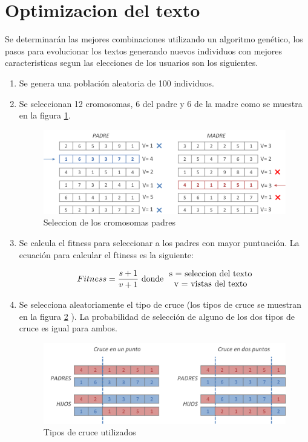 \clearpage
\section{Optimizacion del texto}

Se determinarán las mejores combinaciones utilizando un algoritmo genético, los pasos para evolucionar los textos generando nuevos individuos con mejores caracteristicas segun las elecciones de los usuarios son los siguientes.

\begin{enumerate}[\hspace*{0.5cm} P{a}so 1]
\item Se genera una población aleatoria de 100 individuos.
\item Se seleccionan 12 cromosomas, 6 del padre y 6 de la madre como se muestra en la figura \ref{padres}.

\begin{figure}[htp]
  \centerline{\includegraphics[width=6in]{padres.png}} 
  \caption{Seleccion de los cromosomas padres} 
\label{padres}
\end{figure}

\item Se calcula el fitness para seleccionar a los padres con mayor puntuación. La ecuación para calcular el ftiness es la siguiente:

\begin{equation}
Fitness = \frac{s+1 }{v+1 }   \textup{ donde }   \begin{matrix} \textup{ s = seleccion del texto} \\ \textup{ v = vistas del texto}\end{matrix}
\end{equation}

\item Se selecciona aleatoriamente  el tipo de cruce (los tipos de cruce se muestran en la figura \ref{cruce} ). La probabilidad de selección de alguno de los dos tipos de cruce es igual para ambos.

\begin{figure}[htp]
  \centerline{\includegraphics[width=6in]{cruce.png}} 
  \caption{Tipos de cruce utilizados} 
\label{cruce}
\end{figure}


\end{enumerate}
